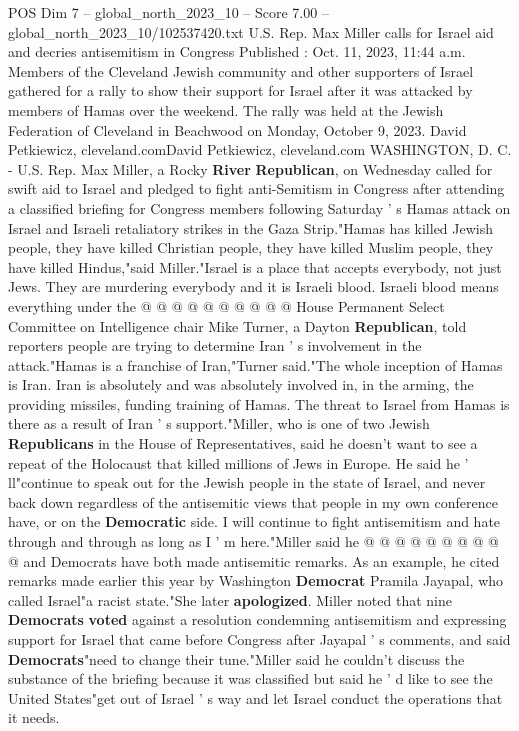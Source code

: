 \begin{textsample}{POS Dim 7 – global\_north\_2023\_10 – Score 7.00 – global\_north\_2023\_10/102537420.txt}  \label{ex:f7_pos_251}
U.S.
Rep.
Max Miller calls for Israel aid and decries antisemitism in Congress Published : Oct. 11, 2023, 11:44 a.m.
Members of the Cleveland Jewish community and other supporters of Israel gathered for a rally to show their support for Israel after it was attacked by members of Hamas over the weekend.
The rally was held at the Jewish Federation of Cleveland in Beachwood on Monday, October 9, 2023.
David Petkiewicz, cleveland.comDavid Petkiewicz, cleveland.com WASHINGTON, D.
C. - U.S.
Rep.
Max Miller, a Rocky \textbf{River} \textbf{Republican}, on Wednesday called for swift aid to Israel and pledged to fight anti-Semitism in Congress after attending a classified briefing for Congress members following Saturday ' s Hamas attack on Israel and Israeli retaliatory strikes in the Gaza Strip."Hamas has killed Jewish people, they have killed Christian people, they have killed Muslim people, they have killed Hindus,"said Miller."Israel is a place that accepts everybody, not just Jews.
They are murdering everybody and it is Israeli blood.
Israeli blood means everything under the @ @ @ @ @ @ @ @ @ @ House Permanent Select Committee on Intelligence chair Mike Turner, a Dayton \textbf{Republican}, told reporters people are trying to determine Iran ' s involvement in the attack."Hamas is a franchise of Iran,"Turner said."The whole inception of Hamas is Iran.
Iran is absolutely and was absolutely involved in, in the arming, the providing missiles, funding training of Hamas.
The threat to Israel from Hamas is there as a result of Iran ' s support."Miller, who is one of two Jewish \textbf{Republicans} in the House of Representatives, said he doesn't want to see a repeat of the Holocaust that killed millions of Jews in Europe.
He said he ' ll"continue to speak out for the Jewish people in the state of Israel, and never back down regardless of the antisemitic views that people in my own conference have, or on the \textbf{Democratic} side.
I will continue to fight antisemitism and hate through and through as long as I ' m here."Miller said he @ @ @ @ @ @ @ @ @ @ and Democrats have both made antisemitic remarks.
As an example, he cited remarks made earlier this year by Washington \textbf{Democrat} Pramila Jayapal, who called Israel"a racist state."She later \textbf{apologized}.
Miller noted that nine \textbf{Democrats} \textbf{voted} against a resolution condemning antisemitism and expressing support for Israel that came before Congress after Jayapal ' s comments, and said \textbf{Democrats}"need to change their tune."Miller said he couldn't discuss the substance of the briefing because it was classified but said he ' d like to see the United States"get out of Israel ' s way and let Israel conduct the operations that it needs.

\end{textsample}
